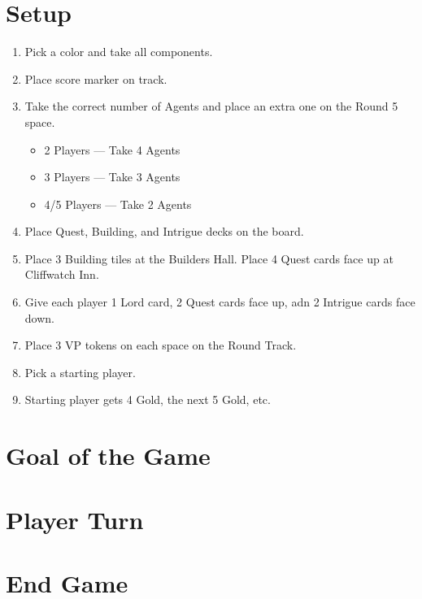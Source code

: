 \documentclass[12pt]{article}
\newenvironment{enumerateCustom}
{\begin{enumerate}
  \setlength{\itemsep}{1pt}
  \setlength{\parskip}{0pt}
  \setlength{\parsep}{0pt}}
{\end{enumerate}}
\newenvironment{itemizeCustom}
{\begin{itemize}
  \setlength{\itemsep}{1pt}
  \setlength{\parskip}{0pt}
  \setlength{\parsep}{0pt}}
{\end{itemize}}
\begin{document}
\begin{mdframed}[style = customFrame]
\begin{multicols*}{2}

\section*{Setup}
\begin{enumerateCustom}
	\item Pick a color and take all components. 
	\item Place score marker on track.
	\item Take the correct number of Agents and place an extra one on the Round 5 space.
		\begin{itemizeCustom}
			\item 2 Players --- Take 4 Agents
			\item 3 Players --- Take 3 Agents
			\item 4/5 Players --- Take 2 Agents
		\end{itemizeCustom}
	\item Place Quest, Building, and Intrigue decks on the board.
	\item Place 3 Building tiles at the Builders Hall. Place 4 Quest cards face up at Cliffwatch Inn.
	\item Give each player 1 Lord card, 2 Quest cards face up, adn 2 Intrigue cards face down.
	\item Place 3 VP tokens on each space on the Round Track.
	\item Pick a starting player.
	\item Starting player gets 4 Gold, the next 5 Gold, etc.
\end{enumerateCustom}

\section*{Goal of the Game}
\section*{Player Turn}
\section*{End Game}

\end{multicols*}
\end{mdframed}
\end{document}
